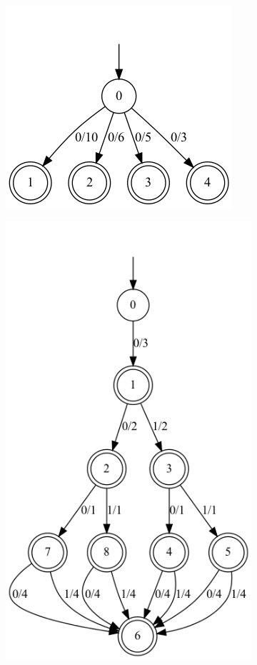 \begin{figure}
    \centering
    \begin{subfigure}{.25\textwidth}
        \centering
        \includegraphics[scale=0.3]{obrazky-figures/add_inners_det_1_img_aut1.png}
        \caption{}
        \label{add_inners_det_1_img_aut1}
    \end{subfigure}
    \hfil
    \begin{subfigure}{.45\textwidth}
        \centering
        \includegraphics[scale=0.3]{obrazky-figures/add_inners_det_1_img_aut2.png}

\end{subfigure}
\end{figure}
